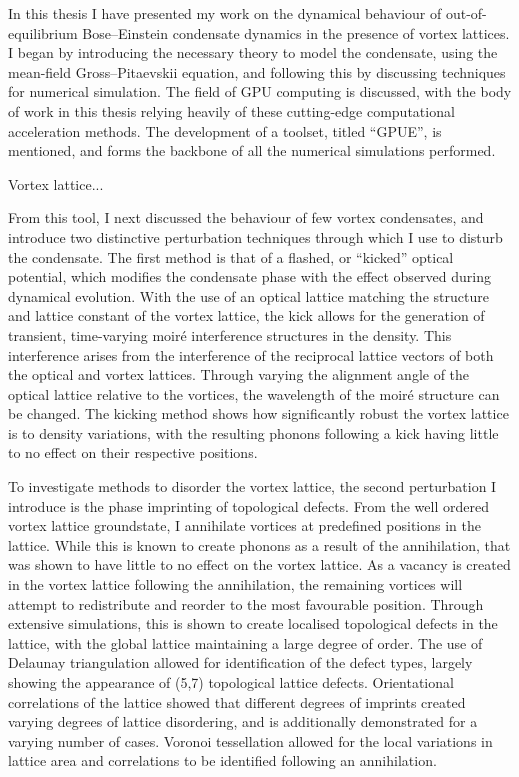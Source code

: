 In this thesis I have presented my work on the dynamical behaviour of out-of-equilibrium Bose--Einstein condensate dynamics in the presence of vortex lattices. I began by introducing the necessary theory to model the condensate, using the mean-field Gross--Pitaevskii equation, and following this by discussing techniques for numerical simulation. The field of GPU computing is discussed, with the body of work in this thesis relying heavily of these cutting-edge computational acceleration methods. The development of a toolset, titled ``GPUE'', is mentioned, and forms the backbone of all the numerical simulations performed.

Vortex lattice...

From this tool, I next discussed the behaviour of few vortex condensates, and introduce two distinctive perturbation techniques through which I use to disturb the condensate. The first method is that of a flashed, or ``kicked'' optical potential, which modifies the condensate phase with the effect observed during dynamical evolution. With the use of an optical lattice matching the structure and lattice constant of the vortex lattice, the kick allows for the generation of transient, time-varying moir\'e interference structures in the density. This interference arises from the interference of the reciprocal lattice vectors of both the optical and vortex lattices. Through varying the alignment angle of the optical lattice relative to the vortices, the wavelength of the moir\'e structure can be changed. The kicking method shows how significantly robust the vortex lattice is to density variations, with the resulting phonons following a kick having little to no effect on their respective positions.


To investigate methods to disorder the vortex lattice, the second perturbation I introduce is the phase imprinting of topological defects. From the well ordered vortex lattice groundstate, I annihilate vortices at predefined positions in the lattice. While this is known to create phonons as a result of the annihilation, that was shown to have little to no effect on the vortex lattice. As a vacancy is created in the vortex lattice following the annihilation, the remaining vortices will attempt to redistribute and reorder to the most favourable position. Through extensive simulations, this is shown to create localised topological defects in the lattice, with the global lattice maintaining a large degree of order. The use of Delaunay triangulation allowed for identification of the defect types, largely showing the appearance of (5,7) topological lattice defects. Orientational correlations of the lattice showed that different degrees of imprints created varying degrees of lattice disordering, and is additionally demonstrated for a varying number of cases. Voronoi tessellation allowed for the local variations in lattice area and correlations to be identified following an annihilation.

